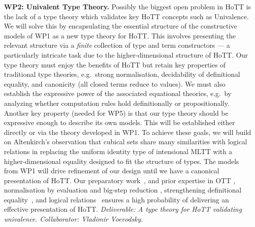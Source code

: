 \documentclass[a4paper,11pt]{article}
\newcommand{\eg}{{e.g.}\ }
\begin{document}
{\bf WP2: Univalent Type Theory.}  Possibly the biggest open
problem in HoTT is the lack of a type theory which validates key HoTT
concepts such as Univalence. We will solve this by encapsulating
the essential structure of the constructive models of WP1 as a new type
theory for HoTT. This involves presenting the relevant structure via 
a {\em finite} collection of type and term constructors --- a 
particularly intricate task due to the  higher-dimensional
structure of HoTT. Our type theory must enjoy the benefits of
HoTT but retain key properties of traditional type theories, \eg strong normalisation, decidability of
definitional equality, and canonicity (all closed terms reduce to values). We must also establish
the expressive power of the associated equational theories, {e.g.}~by
analyzing whether computation rules hold definitionally or
propositionally. Another key property (needed for WP5) is that our 
type theory should be expressive enough to describe its own
models. This will be established either directly or via the theory
developed in WP1.
To achieve these goals, 
we will build on Altenkirch's observation \cite{txa-ihp14} that cubical sets share
many similarities with logical relations in replacing the uniform
identity type of intensional MLTT with a higher-dimensional equality
designed to fit the structure of types. The models from WP1 will drive
refinement of our design until we have a canonical presentation of
HoTT. Our preparatory work~\cite{txa-ihp14}, and prior expertise in OTT
\cite{alti:ott-conf}, normalisation by evaluation and big-step
reduction \cite{alti:lics96}, %
strengthening definitional
equality~\cite{Allais:2013:NEN:2502409.2502411}, and logical
relations~\cite{neil2014relParamDep} ensures a high probability of
delivering an effective presentation of HoTT.  {\em Deliverable: A
  type theory for HoTT validating univalence.
Collaborator: Vladimir Voevodsky.
}
\end{document}
